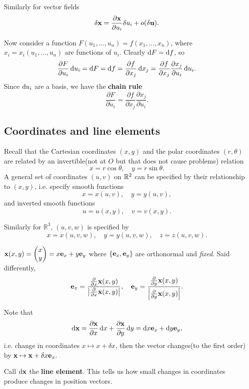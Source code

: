 Similarly for vector fields
\[
    \delta{\bf x} = \frac{\partial {\bf x}}{\partial u_i}\delta u_i+o(\delta{\bf u}). 
\]

Now consider a function $ F(u_1,\dots,u_n)=f(x_1,\dots,x_n) $, where $ x_i=x_i(u_1,\dots,u_n) $ are functions of $u_i$. Clearly $ \mathrm{d} F=\mathrm{d} f $, so 
\[
    \frac{\partial F}{\partial u_i} \,\mathrm{d} u_i=\mathrm{d} F = \mathrm{d} f= \frac{\partial f}{\partial x_j}\,\mathrm{d} x_j = \frac{\partial f}{\partial x_j}\frac{\partial x_j}{\partial u_i}\,\mathrm{d} u_i.  
\]
Since $\mathrm{d} u_i$ are a basis, we have the \textbf{chain rule}
\[
    \frac{\partial F}{\partial u_i}=\frac{\partial f}{\partial x_j}\frac{\partial x_j}{\partial u_i}.
\]

\subsection{Coordinates and line elements}
Recall that the Cartesian coordinates $ (x,y) $ and the polar coordinates $ (r,\theta) $ are related by an invertible(not at $O$ but that does not cause problems) relation
\[
    x=r \cos \theta,\quad y= r\sin \theta.
\]
A general set of coordinates $ (u,v) $ on ${\mathbb{R}}^2$ can be specified by their relationship to $(x,y)$, i.e. specify smooth functions
\[
    x=x(u,v),\quad y=y(u,v),
\]
and inverted smooth functions 
\[
    u=u(x,y),\quad v=v(x,y).
\]

Similarly for $ \mathbb{R}^{3} $, $(u,v,w)$ is specified by 
\[
    x=x(u,v,w),\quad y=y(u,v,w),\quad z=z(u,v,w).
\]

\begin{example}
    $ {\bf x}(x,y)=\begin{pmatrix}
        x \\ y
    \end{pmatrix}=x{\bf e}_x+y{\bf e}_y $ where $ \{{\bf e}_x,{\bf e}_y\} $ are orthonormal and \textit{fixed}. Said differently,
    \[
        {\bf e}_x = \frac{\frac{\partial }{\partial x}{\bf x}(x,y) }{\left| \frac{\partial }{\partial x}{\bf x}(x,y) \right| },\quad {\bf e}_y=\frac{\frac{\partial }{\partial y}{\bf x}(x,y) }{\left| \frac{\partial }{\partial y}{\bf x}(x,y) \right| }.
    \]
\end{example}

Note that 
\[
    \mathrm{d} {\bf x}=\frac{\partial {\bf x}}{\partial x}\,\mathrm{d} x+\frac{\partial {\bf x}}{\partial y}\,\mathrm{d} y=\mathrm{d} x{\bf e}_x+\mathrm{d} y{\bf e}_y,  
\]
i.e. change in coordinates $ x \mapsto x+\delta x $, then the vector changes(to the first order) by $ {\bf x} \mapsto {\bf x}+\delta x{\bf e}_x .$

\begin{definition}
    Call $ \mathrm{d} {\bf x} $ the \textbf{line element}. This tells us how small changes in coordinates produce changes in position vectors.
\end{definition}

